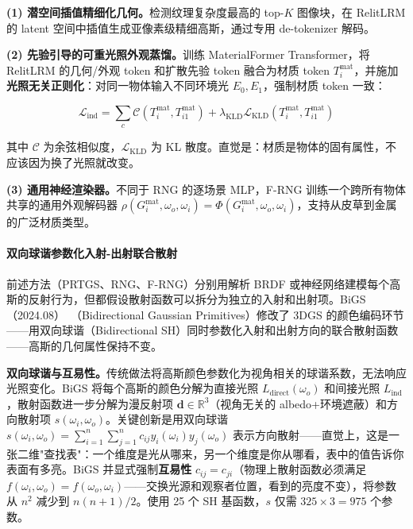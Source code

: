 \textbf{(1) 潜空间插值精细化几何。}检测纹理复杂度最高的 top-$K$ 图像块，在 RelitLRM 的 latent 空间中插值生成亚像素级精细高斯，通过专用 de-tokenizer 解码。

\textbf{(2) 先验引导的可重光照外观蒸馏。}训练 MaterialFormer Transformer，将 RelitLRM 的几何/外观 token 和扩散先验 token 融合为材质 token $T_i^{\text{mat}}$，并施加\textbf{光照无关正则化}：对同一物体输入不同环境光 $E_0, E_1$，强制材质 token 一致：

\begin{equation}
\mathcal{L}_{\text{ind}} = \sum_c \mathcal{C}(T_i^{\text{mat}}, T_{i1}^{\text{mat}}) + \lambda_{\text{KLD}} \mathcal{L}_{\text{KLD}}(T_i^{\text{mat}}, T_{i1}^{\text{mat}})
\end{equation}

其中 $\mathcal{C}$ 为余弦相似度，$\mathcal{L}_{\text{KLD}}$ 为 KL 散度。直觉是：材质是物体的固有属性，不应该因为换了光照就改变。

\textbf{(3) 通用神经渲染器。}不同于 RNG 的逐场景 MLP，F-RNG 训练一个跨所有物体共享的通用外观解码器 $\rho(G_i^{\text{mat}}, \omega_o, \omega_i) = \Phi(G_i^{\text{mat}}, \omega_o, \omega_i)$，支持从皮草到金属的广泛材质类型。

\paragraph{双向球谐参数化入射-出射联合散射}

前述方法（PRTGS、RNG、F-RNG）分别用解析 BRDF 或神经网络建模每个高斯的反射行为，但都假设散射函数可以拆分为独立的入射和出射项。BiGS（2024.08）~\cite{2408_13370}（Bidirectional Gaussian Primitives）修改了 3DGS 的颜色编码环节——用双向球谐（Bidirectional SH）同时参数化入射和出射方向的联合散射函数——高斯的几何属性保持不变。

\textbf{双向球谐与互易性。}传统做法将高斯颜色参数化为视角相关的球谐系数，无法响应光照变化。BiGS 将每个高斯的颜色分解为直接光照 $L_{\text{direct}}(\omega_o)$ 和间接光照 $L_{\text{ind}}$，散射函数进一步分解为漫反射项 $\mathbf{d} \in \mathbb{R}^3$（视角无关的 albedo+环境遮蔽）和方向散射项 $s(\omega_i, \omega_o)$。关键创新是用双向球谐 $s(\omega_i, \omega_o) = \sum_{i=1}^{n} \sum_{j=1}^{n} c_{ij} y_i(\omega_i) y_j(\omega_o)$ 表示方向散射——直觉上，这是一张二维"查找表"：一个维度是光从哪来，另一个维度是你从哪看，表中的值告诉你表面有多亮。BiGS 并显式强制\textbf{互易性} $c_{ij} = c_{ji}$（物理上散射函数必须满足 $f(\omega_i, \omega_o) = f(\omega_o, \omega_i)$——交换光源和观察者位置，看到的亮度不变），将参数从 $n^2$ 减少到 $n(n+1)/2$。使用 25 个 SH 基函数，$s$ 仅需 $325 \times 3 = 975$ 个参数。

